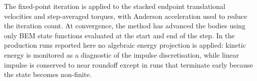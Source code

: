 \documentclass[11pt,a4paper]{article}
\begin{document}
The fixed-point iteration is applied to the stacked endpoint translational
velocities and step-averaged torques, with Anderson acceleration used to reduce
the iteration count.  At convergence, the method has advanced the bodies using
only BEM state functions evaluated at the start and end of the step.  In the
production runs reported here no algebraic energy projection is applied:
kinetic energy is monitored as a diagnostic of the impulse discretisation,
while linear impulse is conserved to near roundoff except in runs that terminate
early because the state becomes non-finite.
\end{document}

